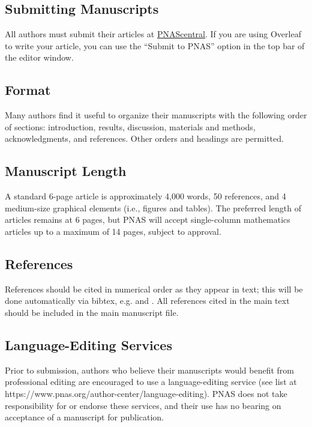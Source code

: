\documentclass[9pt,twoside]{pnas-new}
\begin{document}
\subsection*{Submitting Manuscripts}

All authors must submit their articles at \href{http://www.pnascentral.org/cgi-bin/main.plex}{PNAScentral}. If you are using Overleaf to write your article, you can use the ``Submit to PNAS'' option in the top bar of the editor window.

\subsection*{Format}

Many authors find it useful to organize their manuscripts with the following order of sections: introduction, results, discussion, materials and methods, acknowledgments, and references. Other orders and headings are permitted.

\subsection*{Manuscript Length}

A standard 6-page article is approximately 4,000 words, 50 references, and 4 medium-size graphical elements (i.e., figures and tables). The preferred length of articles remains at 6 pages, but PNAS will accept single-column mathematics articles up to a maximum of 14 pages, subject to approval.

\subsection*{References}

References should be cited in numerical order as they appear in text; this will be done automatically via bibtex, e.g. \cite{belkin2002using} and \cite{berard1994embedding,coifman2005geometric,phdthesis,masterthesis}. All references cited in the main text should be included in the main manuscript file.\Endparasplit

%


\subsection*{Language-Editing Services}
Prior to submission, authors who believe their manuscripts would benefit from professional editing are encouraged to use a language-editing service (see list at https://www.pnas.org/author-center/language-editing). PNAS does not take responsibility for or endorse these services, and their use has no bearing on acceptance of a manuscript for publication.
\end{document}
